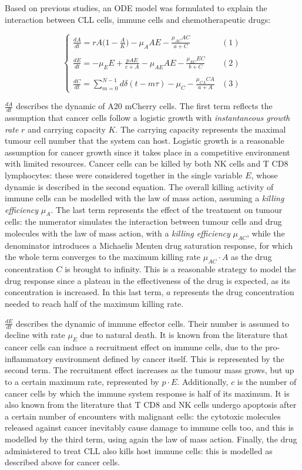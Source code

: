 Based on previous studies, an ODE model was formulated to explain the interaction between CLL cells, immune cells and chemotherapeutic drugs:

\[
\begin{cases} 
	\frac{dA}{dt} = rA \bigl( 1 - \frac{A}{K} \bigr) - \mu_A AE - \frac{\mu_{AC} AC}{a+C} & (1)\\ \\
	\frac{dE}{dt} = -\mu_E E + \frac{pAE}{c+A} - \mu_{AE} AE - \frac{\mu_{EC} EC}{b+C} & (2) \\ \\
	\frac{dC}{dt} = \sum_{m=0}^{N-1} d\delta (t-m\tau) - \mu_{C} - \frac{\mu_{CA} CA}{a+A} & (3) 
\end{cases}
\]

$\frac{dA}{dt}$ describes the dynamic of A20 mCherry cells. The first term reflects the assumption that cancer cells follow a logistic growth with \textit{instantaneous growth rate} $r$ and carrying capacity $K$. The carrying capacity represents the maximal tumour cell number that the system can host. Logistic growth is a reasonable assumption for cancer growth since it takes place in a competitive environment with limited resources. Cancer cells can be killed by both NK cells and T CD8 lymphocytes: these were considered together in the single variable $E$, whose dynamic is described in the second equation. The overall killing activity of immune cells can be modelled with the law of mass action, assuming a \textit{killing efficiency} $\mu_{A}$. The last term represents the effect of the treatment on tumour cells: the numerator simulates the interaction between tumour cells and drug molecules with the law of mass action, with a \textit{killing efficiency} $\mu_{AC}$, while the denominator introduces a Michaelis Menten drug saturation response, for which the whole term converges to the maximum killing rate $\mu_{AC} \cdot A$ as the drug concentration $C$ is brought to infinity. This is a reasonable strategy to model the drug response since a plateau in the effectiveness of the drug is expected, as its concentration is increased. In this last term, $a$ represents the drug concentration needed to reach half of the maximum killing rate. \par
\vspace{0.4cm}
$\frac{dE}{dt}$ describes the dynamic of immune effector cells. Their number is assumed to decline with rate $\mu_{E}$ due to natural death. It is known from the literature that cancer cells can induce a recruitment effect on immune cells, due to the pro-inflammatory environment defined by cancer itself. This is represented by the second term. The recruitment effect increases as the tumour mass grows, but up to a certain maximum rate, represented by $p \cdot E$. Additionally, $c$ is the number of cancer cells by which the immune system response is half of its maximum. It is also known from the literature that T CD8 and NK cells undergo apoptosis after a certain number of encounters with malignant cells: the cytotoxic molecules released against cancer inevitably cause damage to immune cells too, and this is modelled by the third term, using again the law of mass action. Finally, the drug administered to treat CLL also kills host immune cells: this is modelled as described above for cancer cells. \par
